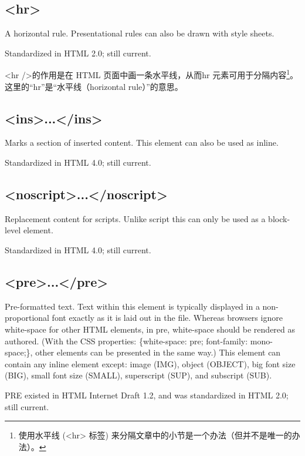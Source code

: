 \subsection{<hr>}


A horizontal rule. Presentational rules can also be drawn with style sheets.

Standardized in HTML 2.0; still current.

<hr />的作用是在 HTML 页面中画一条水平线，从而hr 元素可用于分隔内容\footnote{使用水平线 (<hr> 标签) 来分隔文章中的小节是一个办法（但并不是唯一的办法）。}。这里的“hr”是“水平线（horizontal rule）”的意思。



\subsection{<ins>...</ins>}


Marks a section of inserted content. This element can also be used as inline.

Standardized in HTML 4.0; still current.



\subsection{<noscript>...</noscript>}

Replacement content for scripts. Unlike script this can only be used as a block-level element.

Standardized in HTML 4.0; still current.





\subsection{<pre>...</pre>}


Pre-formatted text. Text within this element is typically displayed in a non-proportional font exactly as it is laid out in the file. Whereas browsers ignore white-space for other HTML elements, in pre, white-space should be rendered as authored. (With the CSS properties: \{white-space: pre; font-family: mono-space;\}, other elements can be presented in the same way.) This element can contain any inline element except: image (IMG), object (OBJECT), big font size (BIG), small font size (SMALL), superscript (SUP), and subscript (SUB).

PRE existed in HTML Internet Draft 1.2, and was standardized in HTML 2.0; still current.



